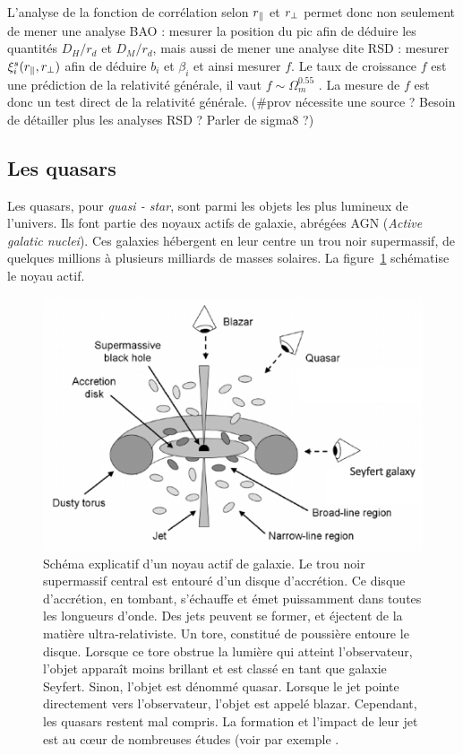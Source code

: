 \documentclass[11pt, twoside, a4paper, openright]{report}
\begin{document}
L'analyse de la fonction de corrélation selon $r_{\parallel}{}$ et $r_{\perp}{}$ permet donc non seulement de mener une analyse BAO : mesurer la position du pic afin de déduire les quantités $D_{H} / r_d$ et $D_{M} / r_d$, mais aussi de mener une analyse dite RSD : mesurer $\xi_i^s(r_{\parallel}{}, r_{\perp}{})$ afin de déduire $b_i$ et $\beta_i$ et ainsi mesurer $f$. Le taux de croissance $f$ est une prédiction de la relativité générale, il vaut $f \sim \Omega_{m}^{\num{0.55}}$ \autocite{Linder2007}. La mesure de $f$ est donc un test direct de la relativité générale. (\#prov nécessite une source ? Besoin de détailler plus les analyses RSD ? Parler de sigma8 ?)

\subsection{Les quasars}
Les quasars, pour \emph{quasi - star}, sont parmi les objets les plus lumineux de l'univers. Ils font partie des noyaux actifs de galaxie, abrégées AGN (\emph{Active galatic nuclei}). Ces galaxies hébergent en leur centre un trou noir supermassif, de quelques millions à plusieurs milliards de masses solaires. La figure~\ref{fig:schema_qso} schématise le noyau actif. 
\begin{figure}
  \centering
  \includegraphics[scale=0.68]{schema_qso2}
  \caption{Schéma explicatif d'un noyau actif de galaxie. Le trou noir supermassif central est entouré d'un disque d'accrétion. Ce disque d'accrétion, en tombant, s'échauffe et émet puissamment dans toutes les longueurs d'onde. Des jets peuvent se former, et éjectent de la matière ultra-relativiste. Un tore, constitué de poussière entoure le disque. Lorsque ce tore obstrue la lumière qui atteint l'observateur, l'objet apparaît moins brillant et est classé en tant que galaxie Seyfert.  Sinon, l'objet est dénommé quasar. Lorsque le jet pointe directement vers l'observateur, l'objet est appelé blazar.
  Cependant, les quasars restent mal compris. La formation et l'impact de leur jet est au c{\oe}ur de nombreuses études (voir par exemple \textcite{Chabanier2020}.}
  \label{fig:schema_qso}
\end{figure}
\end{document}
